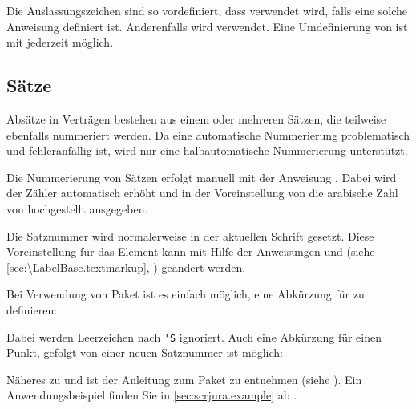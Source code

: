 Die Auslassungszeichen sind so vordefiniert, dass
 verwendet wird, falls eine solche
Anweisung definiert ist. Anderenfalls wird 
verwendet. Eine Umdefinierung von  ist mit
 jederzeit möglich.%
\EndIndexGroup


\subsection{Sätze}
\label{sec:scrjura.sentence}

\BeginIndexGroup%
%
Absätze in Verträgen bestehen aus einem oder mehreren Sätzen, die teilweise
ebenfalls nummeriert werden. Da eine automatische Nummerierung problematisch
und fehleranfällig ist, wird nur eine halbautomatische Nummerierung
unterstützt.

\begin{Declaration}
\end{Declaration}
Die Nummerierung von Sätzen erfolgt manuell mit der Anweisung
. Dabei wird der Zähler  automatisch erhöht
und in der Voreinstellung von
 die arabische
Zahl von  hochgestellt ausgegeben.

%
Die Satznummer wird
normalerweise in der aktuellen Schrift gesetzt. Diese
Voreinstellung für das Element  kann mit
Hilfe der Anweisungen %
 und
 (siehe
\autoref{sec:\LabelBase.textmarkup}, )
geändert werden.%

Bei Verwendung von Paket
 ist es einfach
möglich, eine Abkürzung für  zu definieren:%
\label{sec:scrjura.shorthandexample}%
\begin{lstcode}[moretexcs={useshorthands,defineshorthand}]
\end{lstcode}
Dabei werden Leerzeichen nach
\lstinline|'S| ignoriert. Auch eine
Abkürzung für einen Punkt, gefolgt von einer neuen Satznummer ist möglich:
\begin{lstcode}[moretexcs={useshorthands,defineshorthand}]
\end{lstcode}
Näheres zu  und
 ist der Anleitung zum Paket
 zu entnehmen (siehe \cite{package:babel}). Ein
Anwendungsbeispiel finden Sie in \autoref{sec:scrjura.example} ab
.%
\EndIndexGroup
%
\EndIndexGroup
%
\EndIndexGroup
%
\EndIndexGroup


